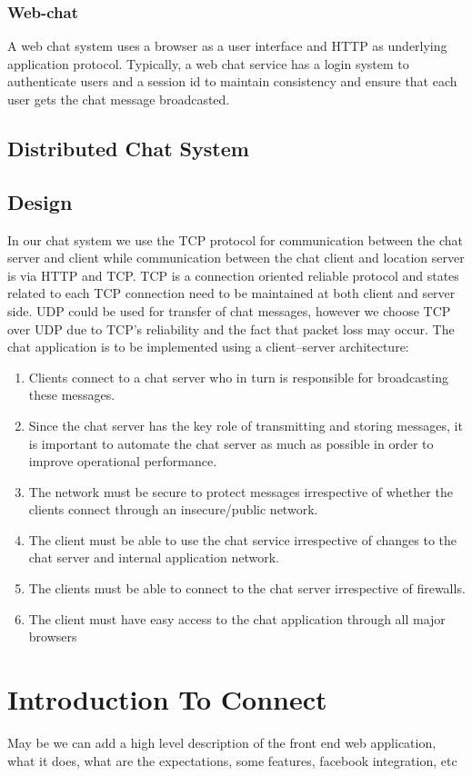 \documentclass[12pt]{article}
\begin{document}
\subsubsection{Web-chat}
A web chat system uses a browser as a user interface and HTTP as underlying application protocol. Typically, a web chat service has a login system to authenticate users and a session id to maintain consistency and ensure that each user gets the chat message broadcasted.
\subsection{Distributed Chat System}
\subsection{Design}
In our chat system we use the TCP protocol for communication between the chat server and client while communication between the chat client and location server is via HTTP and TCP. TCP is a connection oriented reliable protocol and states related to each TCP connection need to be maintained at both client and server side. UDP could be used for transfer of chat messages, however we choose TCP over UDP due to TCP's reliability and the fact that packet loss may occur. 
The chat application is to be implemented using a client–server architecture:
\begin{enumerate}
\item Clients connect to a chat server who in turn is responsible for broadcasting these messages.
\item Since the chat server has the key role of transmitting and storing
messages, it is important to automate the chat server as much as possible in
order to improve operational performance.
\item The network must be secure to protect messages irrespective of whether the
clients connect through an insecure/public network.
\item The client must be able to use the chat service irrespective of changes to
the chat server and internal application network.
\item The clients must be able to connect to the chat server irrespective of
firewalls.
\item The client must have easy access to the chat application through all major
browsers
\end{enumerate}
\section {Introduction To Connect}
May be we can add a high level description of the front end web application, what it does, what are the expectations, some features, facebook integration, etc 
\end{document}

